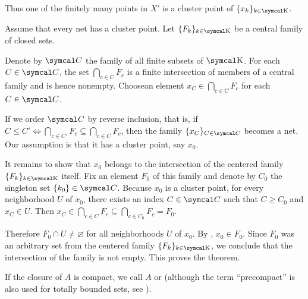 \begin{RefListProof}
    Thus one of the finitely many points in \( X' \) is a cluster point of \( \{ x_k \}_{k \in \CK} \).

    \cite[theorem 3.1.23]{Engelking1989} Assume that every net has a cluster point. Let \( \{ F_k \}_{k \in \CK} \) be a central family of closed sets.

    Denote by \( \Cal C \) the family of all finite subsets of \( \CK \). For each \( C \in \Cal C \), the set \( \bigcap_{c \in C} F_c \) is a finite intersection of members of a central family and is hence nonempty. Choose\AOC an element \( x_C \in \bigcap_{c \in C} F_c \) for each \( C \in \Cal C \).

    If we order \( \Cal C \) by reverse inclusion, that is, if \( C \leq C' \iff \bigcap_{c \in C'} F_c \subseteq \bigcap_{c \in C} F_c \), then the family \( \{ x_C \}_{C \in \Cal C} \) becomes a net. Our assumption is that it has a cluster point, say \( x_0 \).

    It remains to show that \( x_0 \) belongs to the intersection of the centered family \( \{ F_k \}_{k \in \CK} \) itself. Fix an element \( F_0 \) of this family and denote by \( C_0 \) the singleton set \( \{ k_0 \} \in \Cal C \). Because \( x_0 \) is a cluster point, for every neighborhood \( U \) of \( x_0 \), there exists an index \( C \in \Cal C \) such that \( C \geq C_0 \) and \( x_C \in U \). Then \( x_C \in \bigcap_{c \in C} F_c \subseteq \bigcap_{c \in C_0} F_c = F_0 \).

    Therefore \( F_0 \cap U \neq \varnothing \) for all neighborhoods \( U \) of \( x_0 \). By , \( x_0 \in F_0 \). Since \( F_0 \) was an arbitrary set from the centered family \( \{ F_k \}_{k \in \CK} \), we conclude that the intersection of the family is not empty. This proves the theorem.
\end{RefListProof}

\begin{Remark}\label{remark:precompact_set}
  If the closure of \( A \) is compact, we call \( A \)  or  (although the term \enquote{precompact} is also used for totally bounded sets, see ).
\end{Remark}

